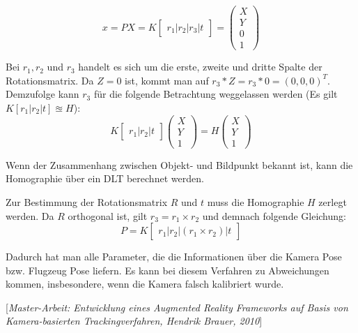 \documentclass{ezb}
\begin{document}
\begin{equation}
x=PX=K
\begin{bmatrix}
r_{1} | r_{2} | r_{3} | t 
\end{bmatrix}
=
\begin{pmatrix}
X \\
Y \\
0 \\
1
\end{pmatrix}
\end{equation} 

Bei $r_{1}, r_{2}$ und $r_{3}$ handelt es sich um die erste, zweite und dritte Spalte der Rotationsmatrix. Da $Z=0$ ist, kommt man auf $r_{3} * Z = r_{3} * 0 = (0,0,0)^T$. Demzufolge kann $r_{3}$ für die folgende Betrachtung weggelassen werden (Es gilt $K[r_{1}|r_{2}|t] \approxeq H$):
\begin{equation}
K
\begin{bmatrix}
r_{1} | r_{2} | t 
\end{bmatrix}
\begin{pmatrix}
X \\
Y \\
1
\end{pmatrix}
=H
\begin{pmatrix}
X \\
Y \\
1
\end{pmatrix}
\end{equation} 

Wenn der Zusammenhang zwischen Objekt- und Bildpunkt bekannt ist, kann die Homographie über ein DLT berechnet werden. 

Zur Bestimmung der Rotationsmatrix $R$ und $t$ muss die Homographie $H$ zerlegt werden. Da $R$ orthogonal ist, gilt $r_3 = r_1 \times r_2$ und demnach folgende Gleichung:
\begin{equation}
P=K
\begin{bmatrix}
r_{1} | r_{2} | (r_1 \times r_2)| t 
\end{bmatrix}
\end{equation} 

Dadurch hat man alle Parameter, die die Informationen über die Kamera Pose bzw. Flugzeug Pose liefern. Es kann bei diesem Verfahren zu Abweichungen kommen, insbesondere, wenn die Kamera falsch kalibriert wurde.

[\textit{Master-Arbeit: Entwicklung eines Augmented Reality
Frameworks auf Basis von Kamera-basierten
Trackingverfahren, Hendrik Brauer, 2010}]


\end{document}
